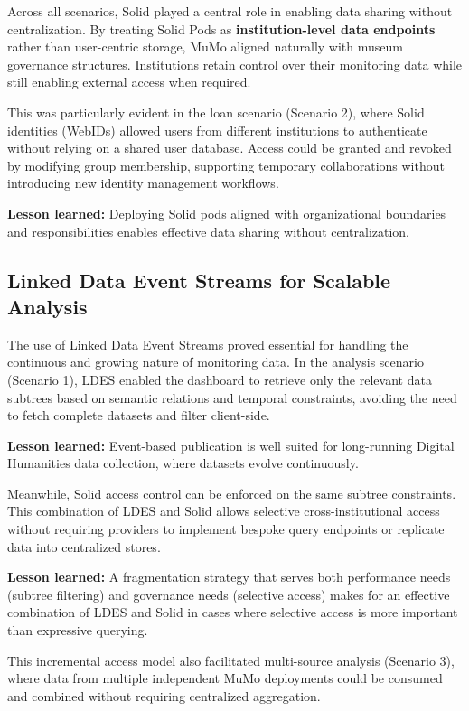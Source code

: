 Across all scenarios, Solid played a central role in enabling data
sharing without centralization. By treating Solid Pods as
\textbf{institution-level data endpoints} rather than user-centric
storage, MuMo aligned naturally with museum governance structures.
Institutions retain control over their monitoring data while still
enabling external access when required.

This was particularly evident in the loan scenario (Scenario 2), where
Solid identities (WebIDs) allowed users from different institutions to
authenticate without relying on a shared user database. Access could be
granted and revoked by modifying group membership, supporting temporary
collaborations without introducing new identity management workflows.

\textbf{Lesson learned:} Deploying Solid pods aligned with
organizational boundaries and responsibilities enables effective data
sharing without centralization.

\subsection{Linked Data Event Streams for Scalable
Analysis}\label{linked-data-event-streams-for-scalable-analysis}

The use of Linked Data Event Streams proved essential for handling the
continuous and growing nature of monitoring data. In the analysis
scenario (Scenario 1), LDES enabled the dashboard to retrieve only the
relevant data subtrees based on semantic relations and temporal
constraints, avoiding the need to fetch complete datasets and filter
client-side.

\textbf{Lesson learned:} Event-based publication is well suited for
long-running Digital Humanities data collection, where datasets evolve
continuously.

Meanwhile, Solid access control can be enforced on the same subtree
constraints. This combination of LDES and Solid allows selective
cross-institutional access without requiring providers to implement
bespoke query endpoints or replicate data into centralized stores.

\textbf{Lesson learned:} A fragmentation strategy that serves both
performance needs (subtree filtering) and governance needs (selective
access) makes for an effective combination of LDES and Solid in cases
where selective access is more important than expressive querying.

This incremental access model also facilitated multi-source analysis
(Scenario 3), where data from multiple independent MuMo deployments
could be consumed and combined without requiring centralized
aggregation.

